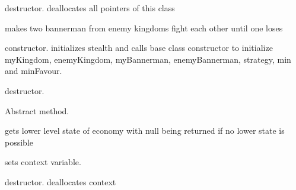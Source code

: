 \begin{DoxyRefList}
%
destructor. deallocates all pointers of this class  
\item[Member \mbox{\hyperlink{class_siege_ae8e9de64c3a659bf32bb35ad4cbcbc2f}{Siege\+::attack}} (\mbox{\hyperlink{class_bannerman}{Bannerman}} $\ast$my\+Bannerman, \mbox{\hyperlink{class_bannerman}{Bannerman}} $\ast$enemy\+Bannerman)]\label{todo__todo000015}%
%
makes two bannerman from enemy kingdoms fight each other until one loses  
\item[Member \mbox{\hyperlink{class_siege_a618c82966756a5e32deb56ccd39b0f41}{Siege\+::Siege}} (int stealth, \mbox{\hyperlink{class_kingdom}{Kingdom}} $\ast$my\+Kingdom, \mbox{\hyperlink{class_kingdom}{Kingdom}} $\ast$enemy\+Kingdom, \mbox{\hyperlink{class_bannerman}{Bannerman}} $\ast$my\+Bannerman, \mbox{\hyperlink{class_bannerman}{Bannerman}} $\ast$enemy\+Bannerman, string name, int min, int min\+Favour)]\label{todo__todo000014}%
%
constructor. initializes stealth and calls base class constructor to initialize my\+Kingdom, enemy\+Kingdom, my\+Bannerman, enemy\+Bannerman, strategy, min and min\+Favour.  
\item[Member \mbox{\hyperlink{class_siege_aac2d09fe50a26b39865aad8c8c9486b9}{Siege\+::$\sim$\+Siege}} ()]\label{todo__todo000016}%
%
destructor.  
\item[Member \mbox{\hyperlink{class_state_a5773daf54efd2c1e6723950d4e44b5a7}{State\+::decrease\+Currency}} ()=0]\label{todo__todo000018}%
%
Abstract method.  
\item[Member \mbox{\hyperlink{class_state_aa901c36d20da2a396e4fa27bf8576eec}{State\+::get\+Demotion\+State}} ()]\label{todo__todo000019}%
%
gets lower level state of economy with null being returned if no lower state is possible  
\item[Member \mbox{\hyperlink{class_state_ae8c1972e00c66761620cf9c3d4d8cb49}{State\+::set\+Context}} (\mbox{\hyperlink{class_economy}{Economy}} $\ast$context)]\label{todo__todo000017}%
%
sets context variable.  
\item[Member \mbox{\hyperlink{class_state_afab438d92b90dc18d194dbd9c9c8bab3}{State\+::$\sim$\+State}} ()]\label{todo__todo000020}%
%
destructor. deallocates context  
\item[Member \mbox{\hyperlink{class_strategy_adecf5b4398ec2dd89bd280441f674de3}{Strategy\+::attack}} (\mbox{\hyperlink{class_bannerman}{Bannerman}} $\ast$my\+Bannerman, \mbox{\hyperlink{class_bannerman}{Bannerman}} $\ast$enemy\+Bannerman)=0]\label{todo__todo000022}%

\end{DoxyRefList}
